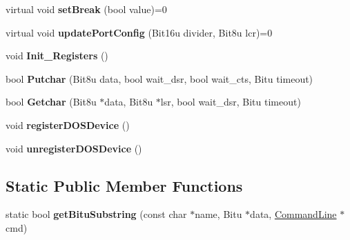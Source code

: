 \begin{DoxyCompactItemize}
\item 
\hypertarget{classCSerial_addc5a34780ee353f12938e5a9e415e26}{virtual void {\bfseries set\-Break} (bool value)=0}\label{classCSerial_addc5a34780ee353f12938e5a9e415e26}

\item 
\hypertarget{classCSerial_a55aa5e9e9dc361068c5388fee1bb14e3}{virtual void {\bfseries update\-Port\-Config} (Bit16u divider, Bit8u lcr)=0}\label{classCSerial_a55aa5e9e9dc361068c5388fee1bb14e3}

\item 
\hypertarget{classCSerial_af5cb5a4a7736486967d4c4ffa65aa4b9}{void {\bfseries Init\-\_\-\-Registers} ()}\label{classCSerial_af5cb5a4a7736486967d4c4ffa65aa4b9}

\item 
\hypertarget{classCSerial_af18a7dc77429ef988d38f3d089ad5bdc}{bool {\bfseries Putchar} (Bit8u data, bool wait\-\_\-dsr, bool wait\-\_\-cts, Bitu timeout)}\label{classCSerial_af18a7dc77429ef988d38f3d089ad5bdc}

\item 
\hypertarget{classCSerial_a6b5cb502f087dd0dfcc167850fd862e9}{bool {\bfseries Getchar} (Bit8u $\ast$data, Bit8u $\ast$lsr, bool wait\-\_\-dsr, Bitu timeout)}\label{classCSerial_a6b5cb502f087dd0dfcc167850fd862e9}

\item 
\hypertarget{classCSerial_afe1ce6961b0ea41e443aa12b3cb2cf3e}{void {\bfseries register\-D\-O\-S\-Device} ()}\label{classCSerial_afe1ce6961b0ea41e443aa12b3cb2cf3e}

\item 
\hypertarget{classCSerial_ae27ec35dbb2623318271adb009077a76}{void {\bfseries unregister\-D\-O\-S\-Device} ()}\label{classCSerial_ae27ec35dbb2623318271adb009077a76}

\end{DoxyCompactItemize}
\subsection*{Static Public Member Functions}
\begin{DoxyCompactItemize}
\item 
\hypertarget{classCSerial_a82488f4091ff6dfa6b40c708642f3df4}{static bool {\bfseries get\-Bitu\-Substring} (const char $\ast$name, Bitu $\ast$data, \hyperlink{classCommandLine}{Command\-Line} $\ast$cmd)}\label{classCSerial_a82488f4091ff6dfa6b40c708642f3df4}

\end{DoxyCompactItemize}
